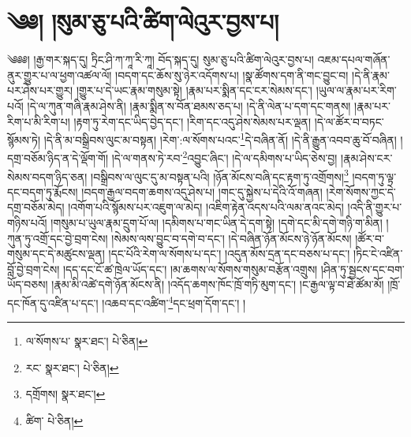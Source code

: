 \setcounter{footnote}{0} 
\chapter{༄༅། །སུམ་ཅུ་པའི་ཚིག་ལེའུར་བྱས་པ།}༄༅༅། །རྒྱ་གར་སྐད་དུ། ཏྲིང་ཤི་ཀ་ཀཱ་རི་ཀཱ། བོད་སྐད་དུ། སུམ་ཅུ་པའི་ཚིག་ལེའུར་བྱས་པ། འཇམ་དཔལ་གཞོན་ནུར་གྱུར་པ་ལ་ཕྱག་འཚལ་ལོ། །བདག་དང་ཆོས་སུ་ཉེར་འདོགས་པ། །སྣ་ཚོགས་དག་ནི་གང་བྱུང་བ། །དེ་ནི་རྣམ་པར་ཤེས་པར་གྱུར། །གྱུར་པ་དེ་ཡང་རྣམ་གསུམ་སྟེ། །རྣམ་པར་སྨིན་དང་ངར་སེམས་དང་། །ཡུལ་ལ་རྣམ་པར་རིག་པའོ། །དེ་ལ་ཀུན་གཞི་རྣམ་ཤེས་ནི། །རྣམ་སྨིན་ས་བོན་ཐམས་ཅད་པ། །དེ་ནི་ལེན་པ་དག་དང་གནས། །རྣམ་པར་རིག་པ་མི་རིག་པ། །རྟག་ཏུ་རེག་དང་ཡིད་བྱེད་དང་། །རིག་དང་འདུ་ཤེས་སེམས་པར་ལྡན། །དེ་ལ་ཚོར་བ་བཏང་སྙོམས་ཏེ། །དེ་ནི་མ་བསྒྲིབས་ལུང་མ་བསྟན། །རེག་:ལ་སོགས་པའང་\footnote{ལ་སོགས་པ་  སྣར་ཐང་།  པེ་ཅིན། }དེ་བཞིན་ནོ། །དེ་ནི་རྒྱུན་འབབ་ཆུ་བོ་བཞིན། །དགྲ་བཅོམ་ཉིད་ན་དེ་ལྡོག་གོ། །དེ་ལ་གནས་ཏེ་རབ་\footnote{རང་  སྣར་ཐང་།  པེ་ཅིན། }འབྱུང་ཞིང་། །དེ་ལ་དམིགས་པ་ཡིད་ཅེས་བྱ། །རྣམ་ཤེས་ངར་སེམས་བདག་ཉིད་ཅན། །བསྒྲིབས་ལ་ལུང་དུ་མ་བསྟན་པའི། །ཉོན་མོངས་བཞི་དང་རྟག་ཏུ་འགྲོགས།\footnote{དགྲོགས།  སྣར་ཐང་། } །བདག་ཏུ་ལྟ་དང་བདག་ཏུ་རྨོངས། །བདག་རྒྱལ་བདག་ཆགས་འདུ་ཤེས་པ། །གང་དུ་སྐྱེས་པ་དེའི་འོ་གཞན། །རེག་སོགས་ཀྱང་དེ་དགྲ་བཅོམ་མེད། །འགོག་པའི་སྙོམས་པར་འཇུག་ལ་མེད། །འཇིག་རྟེན་འདས་པའི་ལམ་ནའང་མེད། །འདི་ནི་གྱུར་པ་གཉིས་པའོ། །གསུམ་པ་ཡུལ་རྣམ་དྲུག་པོ་ལ། །དམིགས་པ་གང་ཡིན་དེ་དག་སྟེ། །དགེ་དང་མི་དགེ་གཉི་ག་མིན། །ཀུན་ཏུ་འགྲོ་དང་བྱེ་བྲག་ངེས། །སེམས་ལས་བྱུང་བ་དགེ་བ་དང་། །དེ་བཞིན་ཉོན་མོངས་ཉེ་ཉོན་མོངས། །ཚོར་བ་གསུམ་དང་དེ་མཚུངས་ལྡན། །དང་པོའི་རེག་ལ་སོགས་པ་དང་། །འདུན་མོས་དྲན་དང་བཅས་པ་དང་། །ཏིང་ངེ་འཛིན་བློ་བྱེ་བྲག་ངེས། །དད་དང་ངོ་ཚ་ཁྲེལ་ཡོད་དང་། །མ་ཆགས་ལ་སོགས་གསུམ་བརྩོན་འགྲུས། །ཤིན་ཏུ་སྦྱངས་དང་བག་ཡོད་བཅས། །རྣམ་མི་འཚེ་དགེ་ཉོན་མོངས་ནི། །འདོད་ཆགས་ཁོང་ཁྲོ་གཏི་མུག་དང་། །ང་རྒྱལ་ལྟ་བ་ཐེ་ཚོམ་མོ། །ཁྲོ་དང་ཁོན་དུ་འཛིན་པ་དང་། །འཆབ་དང་འཚིག་\footnote{ཚིག་  པེ་ཅིན། }དང་ཕྲག་དོག་དང་། །
